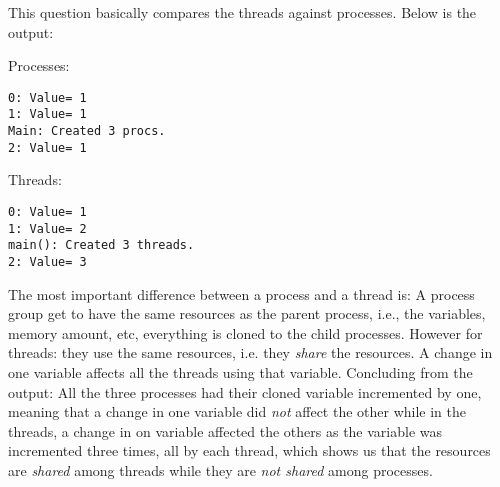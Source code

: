 \documentclass{article}
\begin{document}
This question basically compares the threads against processes. Below is the output:

Processes:
\begin{lstlisting}
0: Value= 1
1: Value= 1
Main: Created 3 procs.
2: Value= 1
\end{lstlisting}

Threads:
\begin{lstlisting}
0: Value= 1
1: Value= 2
main(): Created 3 threads.
2: Value= 3
\end{lstlisting}

The most important difference between a process and a thread is: A process group get to have the same resources as the parent process, i.e., the variables,
memory amount, etc, everything is cloned to the child processes. However for threads: they use the same resources, i.e. they \emph{share} the resources. A change
in one variable affects all the threads using that variable. 
Concluding from the output: All the three processes had their cloned variable incremented by one, meaning that 
a change in one variable did \emph{not} affect the other while in the threads, a change in on variable affected the others as the variable was incremented
three times, all by each thread, which shows us that the resources are \emph{shared} among threads while they are \emph{not shared} among processes.
\end{document}
